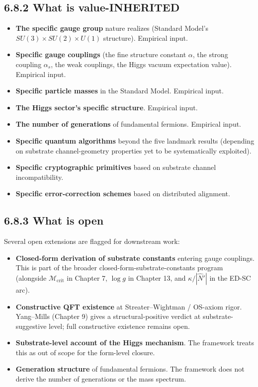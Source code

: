 \documentclass[11pt]{book}
\begin{document}
\subsection{6.8.2 What is value-INHERITED}

\begin{itemize}
\item \textbf{The specific gauge group} nature realizes (Standard Model's $SU(3) \times SU(2) \times U(1)$ structure). Empirical input.
\item \textbf{Specific gauge couplings} (the fine structure constant $\alpha$, the strong coupling $\alpha_s$, the weak couplings, the Higgs vacuum expectation value). Empirical input.
\item \textbf{Specific particle masses} in the Standard Model. Empirical input.
\item \textbf{The Higgs sector's specific structure}. Empirical input.
\item \textbf{The number of generations} of fundamental fermions. Empirical input.
\item \textbf{Specific quantum algorithms} beyond the five landmark results (depending on substrate channel-geometry properties yet to be systematically exploited).
\item \textbf{Specific cryptographic primitives} based on substrate channel incompatibility.
\item \textbf{Specific error-correction schemes} based on distributed alignment.
\end{itemize}

\subsection{6.8.3 What is open}

Several open extensions are flagged for downstream work:

\begin{itemize}
\item \textbf{Closed-form derivation of substrate constants} entering gauge couplings. This is part of the broader closed-form-substrate-constants program (alongside $\mathcal{M}_\mathrm{crit}$ in Chapter 7, $\log g$ in Chapter 13, and $\kappa/|\hat{N}'|$ in the ED-SC arc).
\item \textbf{Constructive QFT existence} at Streater–Wightman / OS-axiom rigor. Yang–Mills (Chapter 9) gives a structural-positive verdict at substrate-suggestive level; full constructive existence remains open.
\item \textbf{Substrate-level account of the Higgs mechanism}. The framework treats this as out of scope for the form-level closure.
\item \textbf{Generation structure} of fundamental fermions. The framework does not derive the number of generations or the mass spectrum.
\end{itemize}
\end{document}

